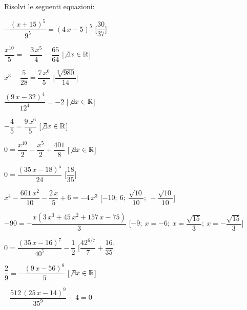 \begin{esercizio}\label{ese:03.1}
Risolvi le seguenti equazioni:
\begin{enumeratea}
\item \(-{\dfrac{ \left( x+15 \right) ^{5}}{9^5}}= \left( 4\,x-5 \right) 
^{5}\) 
\hfill [\(\dfrac{30}{37}\)]
\item \({\dfrac{{x}^{10}}{5}}=-{\dfrac{3\,{x}^{5}}{4}}-{\dfrac{65}{64}}\) 
\hfill [\(\not\exists x \in \mathbb{R}\)]
\item \({x}^{3}-{\dfrac{5}{28}}={\dfrac{7\,{x}^{6}}{5}}\) 
\hfill [\(\dfrac{\sqrt [3]{980}}{14}\)]
\item \({\dfrac{ \left( 9\,x-32 \right) ^{4}}{12^4}}=-2\) 
\hfill [\(\not\exists x \in \mathbb{R}\)]
\item \(-{\dfrac{4}{5}}={\dfrac{9\,{x}^{6}}{5}}\) 
\hfill [\(\not\exists x \in \mathbb{R}\)]
\item \(0={\dfrac{{x}^{10}}{2}}-{\dfrac{{x}^{5}}{2}}+{\dfrac{401}{8}}\) 
\hfill [\(\not\exists x \in \mathbb{R}\)]
\item \(0={\dfrac{ \left( 35\,x-18 \right) ^{5}}{24}}\) 
\hfill [\(\dfrac{18}{35}\)]
\item \({x}^{4}-{\dfrac{601\,{x}^{2}}{10}}-{\dfrac
{2\,x}{5}}+6=-4\,{x}^{3}\) 
\hfill [\(-10;~6;~{\dfrac{\sqrt {10}}{10}};~
-{\dfrac{\sqrt {10}}{10}}\)]
\item \(-90=-{\dfrac{x \left( 3\,{x}^{3}+45\,{x}^{2}+157\,x-75 \right) 
}{3}}\) 
\hfill 
[\(-9;~x=-6;~x={\dfrac{\sqrt {15}}{3}};~x=-{\dfrac{\sqrt{15}}{3}}\)]
\item \(0={\dfrac{ \left( 35\,x-16 \right) ^{7}}{40^7}}-{\dfrac{1}{2}}\) 
\hfill [\({\dfrac{4 {2}^{6/7}}{7}}+{\dfrac{16}{35}}\)]
\item \({\dfrac{2}{9}}=-{\dfrac{ \left( 9\,x-56 \right) ^{8}}{5}}\) 
\hfill [\(\not\exists x \in \mathbb{R}\)]
\item \(-{\dfrac{512\, \left( 25\,x-14 \right) ^{9}}{35^9}}+4=0\) 

\end{enumeratea}
\end{esercizio}
